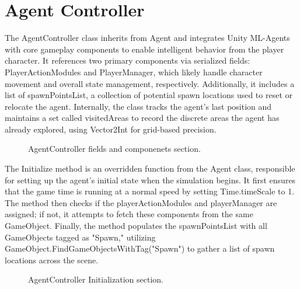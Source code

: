 \documentclass[12pt,oneside,openright,a4paper]{cpe-english-project}
\begin{document}
\section{Agent Controller}
The AgentController class inherits from Agent and integrates Unity ML-Agents with core gameplay components to enable intelligent behavior from the player character. It references two primary components via serialized fields: PlayerActionModules and PlayerManager, which likely handle character movement and overall state management, respectively. Additionally, it includes a list of spawnPointsList, a collection of potential spawn locations used to reset or relocate the agent. Internally, the class tracks the agent's last position and maintains a set called visitedAreas to record the discrete areas the agent has already explored, using Vector2Int for grid-based precision.\par
 \begin{figure}[!h]
 \centering
\caption{AgentController fields and componenets section.}\label{fig:agentfac}
\end{figure}
\newpage
The Initialize method is an overridden function from the Agent class, responsible for setting up the agent’s initial state when the simulation begins. It first ensures that the game time is running at a normal speed by setting Time.timeScale to 1. The method then checks if the playerActionModules and playerManager are assigned; if not, it attempts to fetch these components from the same GameObject. Finally, the method populates the spawnPointsList with all GameObjects tagged as "Spawn," utilizing GameObject.FindGameObjectsWithTag("Spawn") to gather a list of spawn locations across the scene.\par
 \begin{figure}[!h]
 \centering
\caption{AgentController Initialization section.}\label{fig:agentini}
\end{figure}
\end{document}
